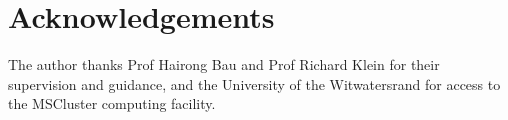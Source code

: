 \documentclass[journal,10pt,twoside]{IEEEtran}
\begin{document}







\section*{Acknowledgements}
The author thanks Prof Hairong Bau and Prof Richard Klein for their supervision and
guidance, and the University of the Witwatersrand for access to the MSCluster
computing facility.

{\footnotesize\setlength{\bibsep}{1pt}
}

\clearpage
\onecolumn


\end{document}
